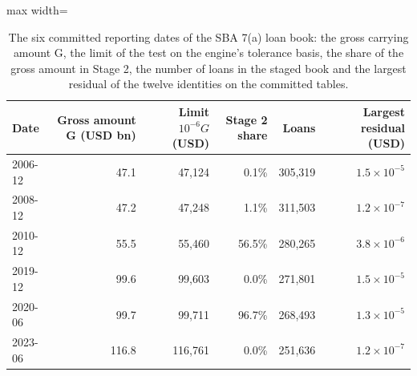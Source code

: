 \begin{table}[tbp]
\centering
\small
\caption{The six committed reporting dates of the SBA 7(a) loan book: the gross carrying amount G, the limit of the test on the engine's tolerance basis, the share of the gross amount in Stage 2, the number of loans in the staged book and the largest residual of the twelve identities on the committed tables.}
\label{tab:data}
\begin{adjustbox}{max width=\textwidth}
\begin{tabular}{lrrrrr}
\toprule
Date & Gross amount G (USD bn) & Limit $10^{-6}G$ (USD) & Stage 2 share & Loans & Largest residual (USD) \\
\midrule
2006-12 & 47.1 & 47,124 & 0.1\% & 305,319 & $1.5\times10^{-5}$ \\
2008-12 & 47.2 & 47,248 & 1.1\% & 311,503 & $1.2\times10^{-7}$ \\
2010-12 & 55.5 & 55,460 & 56.5\% & 280,265 & $3.8\times10^{-6}$ \\
2019-12 & 99.6 & 99,603 & 0.0\% & 271,801 & $1.5\times10^{-5}$ \\
2020-06 & 99.7 & 99,711 & 96.7\% & 268,493 & $1.3\times10^{-5}$ \\
2023-06 & 116.8 & 116,761 & 0.0\% & 251,636 & $1.2\times10^{-7}$ \\
\bottomrule
\end{tabular}
\end{adjustbox}
\end{table}

